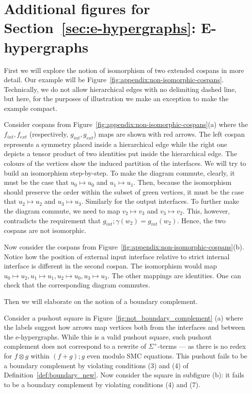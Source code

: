\section{Additional figures for Section~\ref{sec:e-hypergraphs}: E-hypergraphs}
\label{sec:appendix:iso}

First we will explore the notion of isomorphism of two extended cospans in more detail.
Our example will be Figure~\ref{fig:appendix:non-isomorphic-cospans}.
Technically, we do not allow hierarchical edges with no delimiting dashed line, but here, for the purposes of illustration we make an exception to make the example compact.
\begin{example}
    Consider cospans from Figure~\ref{fig:appendix:non-isomorphic-cospans}(a) where the $f_{int}, f_{ext}$ (respectively, $g_{int},g_{ext}$) maps are shown with red arrows.
    The left cospan represents a symmetry placed inside a hierarchical edge while the right one depicts a tensor product of two identities put inside the hierarchical edge.
    The colours of the vertices show the induced partition of the interfaces.
    We will try to build an isomorphism step-by-step.
    To make the diagram commute, clearly, it must be the case that $u_0 \mapsto u_0$ and $u_1 \mapsto u_1$.
    Then, because the isomorphism should preserve the order within the subset of green vertices, it must be the case that $u_2 \mapsto u_2$ and $u_3 \mapsto u_3$.
    Similarly for the output interfaces.
    To further make the diagram commute, we need to map $v_2 \mapsto v_3$ and $v_3 \mapsto v_2$.
    This, however, contradicts the requirement that $g_{int};\gamma(w_2) = g_{int}(w_2)$.
    Hence, the two cospans are not isomorphic.
\end{example}

\begin{example}
    Now consider the cospans from Figure~\ref{fig:appendix:non-isomorphic-cospans}(b).
    Notice how the position of external input interface relative to strict internal interface is different in the second cospan.
    The isomorphism would map $u_0 \mapsto u_2, u_1 \mapsto u_1, u_2 \mapsto u_0, u_3 \mapsto u_3$.
    The other mappings are identities. 
    One can check that the corresponding diagram commutes.
\end{example}

Then we will elaborate on the notion of a boundary complement.

\begin{example}

Consider a pushout square in Figure~\ref{fig:not_boundary_complement} (a) where the labels suggest how arrows map vertices both from the interfaces and between the e-hypergraphs.
While this is a valid pushout square, such pushout complement does not correspond to a rewrite of $\Sigma^{+}$-terms --- as there is no redex for $f \otimes g$ within $(f + g);g$ even modulo SMC equations.
This pushout fails to be a boundary complement by violating conditions (3) and (4) of Definition~\ref{def:boundary_new}.
Now consider the square in subfigure (b): it fails to be a boundary complement by violating conditions (4) and (7).
\end{example}

